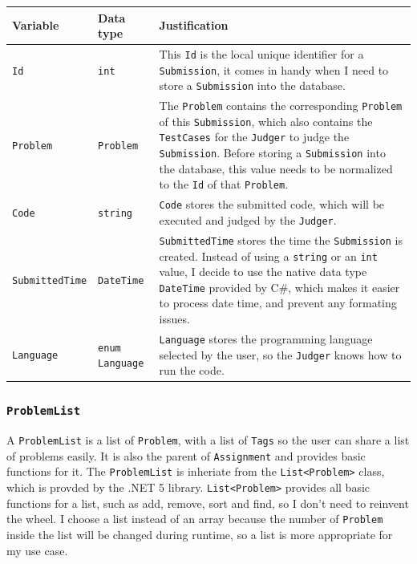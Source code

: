 \documentclass[a4paper]{report}
\begin{document}
\begin{tabulary}{\textwidth}{|l|l|L|}
    \hline
    Variable & Data type & Justification \\
    \hline
    \texttt{Id} & \texttt{int} & This \texttt{Id} is the local unique identifier for a \texttt{Submission}, it comes in handy when I need to store a \texttt{Submission} into the database. \\
    \hline
    \texttt{Problem} & \texttt{Problem} & The \texttt{Problem} contains the corresponding \texttt{Problem} of this \texttt{Submission}, which also contains the \texttt{TestCases} for the \texttt{Judger} to judge the \texttt{Submission}. Before storing a \texttt{Submission} into the database, this value needs to be normalized to the \texttt{Id} of that \texttt{Problem}. \\
    \hline
    \texttt{Code} & \texttt{string} & \texttt{Code} stores the submitted code, which will be executed and judged by the \texttt{Judger}. \\
    \hline
    \texttt{SubmittedTime} & \texttt{DateTime} & \texttt{SubmittedTime} stores the time the \texttt{Submission} is created. Instead of using a \texttt{string} or an \texttt{int} value, I decide to use the native data type \texttt{DateTime} provided by C\#, which makes it easier to process date time, and prevent any formating issues. \\
    \hline
    \texttt{Language} & \texttt{enum Language} & \texttt{Language} stores the programming language selected by the user, so the \texttt{Judger} knows how to run the code.\\
    \hline
\end{tabulary}

\subsubsection{\texttt{ProblemList}}

A \texttt{ProblemList} is a list of \texttt{Problem}, with a list of \texttt{Tags} so the user can share a list of problems easily. It is also the parent of \texttt{Assignment} and provides basic functions for it. The \texttt{ProblemList} is inheriate from the \texttt{List<Problem>} class, which is provded by the .NET 5 library. \texttt{List<Problem>} provides all basic functions for a list, such as add, remove, sort and find, so I don't need to reinvent the wheel. I choose a list instead of an array because the number of \texttt{Problem} inside the list will be changed during runtime, so a list is more appropriate for my use case.
\end{document}
